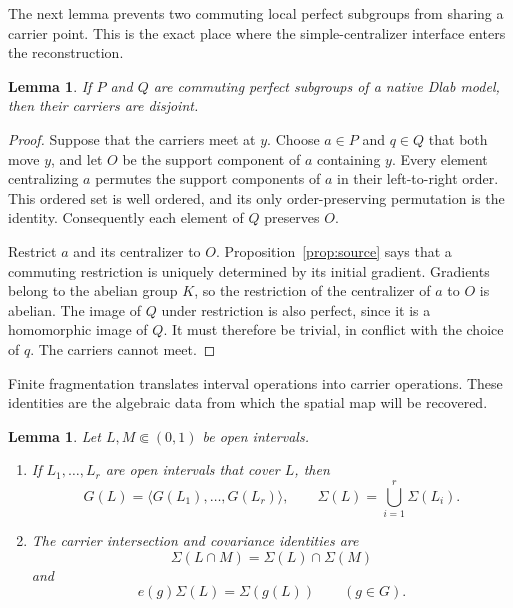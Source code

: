 \documentclass[11pt]{amsart}
\newtheorem{lemma}[theorem]{Lemma}
\theoremstyle{definition}
\theoremstyle{remark}
\numberwithin{equation}{section}
\begin{document}
The next lemma prevents two commuting local perfect subgroups from sharing a carrier point. This is the exact place where the simple-centralizer interface enters the reconstruction.

\begin{lemma}
\label{lem:carrier-disjoint}
If \(P\) and \(Q\) are commuting perfect subgroups of a native Dlab model, then their carriers are disjoint.
\end{lemma}

\begin{proof}
Suppose that the carriers meet at \(y\). Choose \(a\in P\) and \(q\in Q\) that both move \(y\), and let \(O\) be the support component of \(a\) containing \(y\). Every element centralizing \(a\) permutes the support components of \(a\) in their left-to-right order. This ordered set is well ordered, and its only order-preserving permutation is the identity. Consequently each element of \(Q\) preserves \(O\).

Restrict \(a\) and its centralizer to \(O\). Proposition~\ref{prop:source} says that a commuting restriction is uniquely determined by its initial gradient. Gradients belong to the abelian group \(K\), so the restriction of the centralizer of \(a\) to \(O\) is abelian. The image of \(Q\) under restriction is also perfect, since it is a homomorphic image of \(Q\). It must therefore be trivial, in conflict with the choice of \(q\). The carriers cannot meet.
\end{proof}

Finite fragmentation translates interval operations into carrier operations. These identities are the algebraic data from which the spatial map will be recovered.

\begin{lemma}
\label{lem:carrier-calculus}
Let \(L,M\Subset(0,1)\) be open intervals.
\begin{enumerate}
\item If \(L_1,\ldots,L_r\) are open intervals that cover \(L\), then
\[
G(L)=\langle G(L_1),\ldots,G(L_r)\rangle,
\qquad
\Sigma(L)=\bigcup_{i=1}^r\Sigma(L_i).
\]
\item The carrier intersection and covariance identities are
\[
\Sigma(L\cap M)=\Sigma(L)\cap\Sigma(M)
\]
and
\[
e(g)\Sigma(L)=\Sigma(g(L))
\qquad(g\in G).
\]
\end{enumerate}
\end{lemma}
\end{document}
